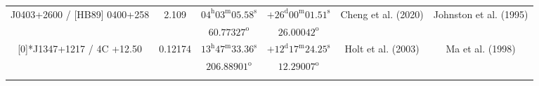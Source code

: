 \begin{landscape}
\begin{longtable}{cccccc}
  \multirow{2}[0]{*}{J0403+2600 / [HB89] 0400+258} & \multirow{2}[0]{*}{2.109} &  
    $04^\text{h}03^\text{m}05.58^\text{s}$  & $+26^\text{d}00^\text{m}01.51^\text{s}$  & 
    \multirow{2}[0]{*}{Cheng et al. (2020) \cite{RedRef20_2020}}& \multirow{2}[0]{*}{Johnston et al. (1995)\cite{CoordRef0_1995}} \\*
    & & $ 60.77327 ^\text{o}$ & $ 26.00042 ^\text{o}$ & & \\ \addlinespace 

  \multirow{2}[0]{*}{J1347+1217 / 4C +12.50} & \multirow{2}[0]{*}{0.12174} &  
    $13^\text{h}47^\text{m}33.36^\text{s}$  & $+12^\text{d}17^\text{m}24.25^\text{s}$  & 
    \multirow{2}[0]{*}{Holt et al. (2003) \cite{RedRef119_2003}}& \multirow{2}[0]{*}{Ma et al. (1998)\cite{CoordRef119_1998}} \\*
    & & $206.88901^\text{o}$ & $12.29007^\text{o}$ & & \\ \addlinespace 





    \end{longtable}
\end{landscape}































